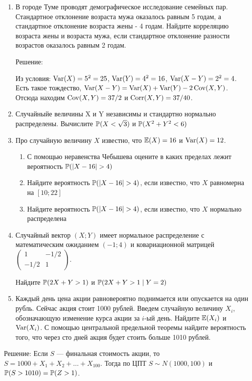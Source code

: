 \documentclass[12pt, a4paper]{article}\usepackage[]{graphicx}\usepackage[]{color}
\begin{document}
\begin{enumerate}
\item В  городе Туме проводят демографическое исследование семейных пар. Стандартное отклонение возраста мужа оказалось равным 5 годам, а стандартное отклонение возраста жены - 4 годам. Найдите корреляцию возраста жены и возраста мужа, если стандартное отклонение разности возрастов оказалось равным 2 годам.


Решение:

Из условия: $\Var(X)=5^2=25$, $\Var(Y)=4^2=16$, $\Var(X-Y)=2^2=4$. Есть такое тождество, $\Var(X-Y)=\Var(X)+\Var(Y)-2\Cov(X,Y)$. Отсюда находим $\Cov(X,Y)=37/2$ и $\Corr(X,Y)=37/40$.

\item Случайныйе величины X и Y независимы и стандартно нормально распределены. Вычислите $\P(X<\sqrt{3})$ и $\P(X^2+Y^2<6)$

\item  Про случайную величину $X$ известно, что $\E(X)=16$ и $\Var(X)=12$.
\begin{enumerate}
\item С помощью неравенства Чебышева оцените в каких пределах лежит вероятность $\P(|X-16|>4)$
\item Найдите вероятность $\P(|X-16|>4)$, если известно, что $X$ равномерна на $[10;22]$
\item Найдите вероятность $\P(|X-16|>4)$, если известно, что $X$ нормально распределена
\end{enumerate}


\item Случайный вектор $(X;Y)$ имеет нормальное распределение с математическим ожиданием $(-1;4)$ и ковариационной матрицей $\left( \begin{array}{cc}
1 & -1/2 \\
-1/2 & 1
\end{array} \right)$.


Найдите   $\P(2X+Y>1)$ и $\P(2X+Y>1 \mid Y=2)$

\item Каждый день цена акции равновероятно поднимается или опускается на один рубль. Сейчас акция стоит 1000 рублей. Введем случайную величину $X_i$, обозначающую изменение курса акции за $i$-ый день. Найдите $\E(X_i)$  и $\Var(X_i)$. С помощью центральной предельной теоремы найдите вероятность того, что через сто дней акция будет стоить больше 1010 рублей.
\end{enumerate}

Решение: Если $S$ — финальная стоимость акции, то $S=1000+X_1+X_2+\ldots+X_{100}$. Тогда по ЦПТ $S\sim N(1000,100)$ и $\P(S>1010)=\P(Z>1)$.
\end{document}
